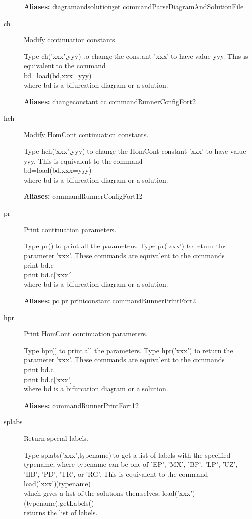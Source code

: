 \documentclass[12pt]{report}
\begin{document}
\begin{description}
\textbf{Aliases:} diagramandsolutionget commandParseDiagramAndSolutionFile

\item[ch]
Modify continuation constants.

    Type ch('xxx',yyy) to change the constant 'xxx' to have
    value yyy.
    This is equivalent to the command\\
    bd=load(bd,xxx=yyy)\\
    where bd is a bifurcation diagram or a solution.

\textbf{Aliases:} changeconstant cc commandRunnerConfigFort2

\item[hch]
Modify HomCont continuation constants.

    Type hch('xxx',yyy) to change the HomCont constant 'xxx' to have
    value yyy.
    This is equivalent to the command\\
    bd=load(bd,xxx=yyy)\\
    where bd is a bifurcation diagram or a solution.
    
\textbf{Aliases:} commandRunnerConfigFort12

\item[pr]
Print continuation parameters.

    Type pr() to print all the parameters.
    Type pr('xxx') to return the parameter 'xxx'.
    These commands are equivalent to the commands\\
    print bd.c\\
    print bd.c['xxx']\\
    where bd is a bifurcation diagram or a solution.
    
\textbf{Aliases:} pc pr printconstant commandRunnerPrintFort2

\item[hpr]
Print HomCont continuation parameters.

    Type hpr() to print all the parameters.
    Type hpr('xxx') to return the parameter 'xxx'.
    These commands are equivalent to the commands\\
    print bd.c\\
    print bd.c['xxx']\\
    where bd is a bifurcation diagram or a solution.
    
\textbf{Aliases:} commandRunnerPrintFort12

\item[splabs]
Return special labels.
        
    Type splabs('xxx',typename) to get a list of labels with the specified
    typename, where typename can be one of
    'EP', 'MX', 'BP', 'LP', 'UZ', 'HB', 'PD', 'TR', or 'RG'.
    This is equivalent to the command\\
    load('xxx')(typename)\\
    which gives a list of the solutions themselves;
    load('xxx')(typename).getLabels()\\
    returns the list of labels.


\end{description}
\end{document}
